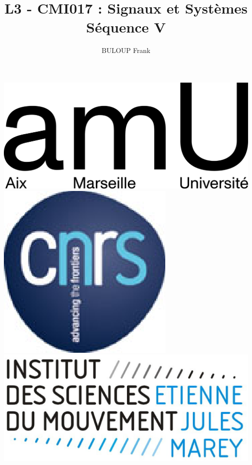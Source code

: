 \documentclass[a4paper,11pt]{beamer}
\title{L3 - CMI017 : Signaux et Systèmes\\Séquence V}
\author{BULOUP Frank}
\institute{Aix Marseille Université\\Institut des Sciences du Mouvement}
\date{}
\begin{document}
\begin{frame}[plain]  
	\titlepage  
	\vspace{1cm}
	
	\includegraphics[scale=0.6]{images/LogoAMU.png}\hspace*{2cm}
	\includegraphics[scale=0.2]{images/LogoCNRS.eps}\hspace*{2cm}
	\includegraphics[scale=0.1]{images/LogoISM.eps}
\end{frame} 
  
\end{document}
